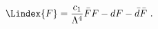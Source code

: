\begin{equation}
  \label{eq:vyFlag}
  \Lindex{F} = \frac{c_1}{\Lambda^4} \bar{F} F - d F - \bar{d} \bar{F}\ .
\end{equation}

